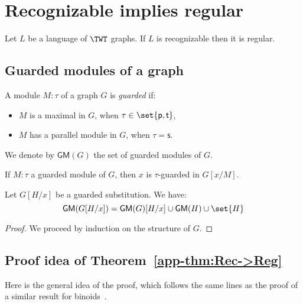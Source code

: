 \section{Recognizable implies regular}\label{app-sec:rec->reg}


\begin{theorem}\label{app-thm:Rec->Reg}
Let $L$ be a language of $\TWT$ graphs. If $L$ is recognizable then it is regular. 
\end{theorem}

\subsection{Guarded modules of a graph}

\begin{definition}
A module $M:\tau$ of a graph $G$ is \emph{guarded} if:
\begin{itemize}
\item $M$ is a maximal in $G$, when $\tau\in\set{\mathsf{p}, \mathsf{t}}$,
\item $M$ has a parallel module in $G$, when $\tau=\mathsf{s}$.
\end{itemize}
We denote by $\mathsf{GM}(G)$ the set of guarded modules of $G$.
\end{definition}

\begin{proposition}
If $M:\mathsf{\tau}$ a guarded module of $G$, then $x$ is $\tau$-guarded in $G[x/M]$. 
%
\end{proposition}


\begin{lemma}\label{app-lem:pure-substitution}
Let  $G[H/x]$ be a guarded substitution. We have: 
$$\mathsf{GM}(G[H/x])=  \mathsf{GM}(G)[H/x] \cup \mathsf{GM}(H) \cup \set{H} $$
\end{lemma}
\begin{proof}
We proceed by induction on the structure of $G$. 
\end{proof}

\subsection{Proof idea of Theorem~\ref{app-thm:Rec->Reg}}
Here is the general idea of the proof, which follows the same lines as the proof of a similar result for binoids~\cite{Gazdag}.

